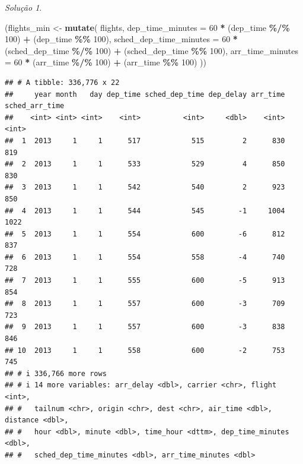 \documentclass[
]{latex/krantz}
\newenvironment{Shaded}{\begin{snugshade}}{\end{snugshade}}
\newcommand{\AttributeTok}[1]{\textcolor[rgb]{0.13,0.29,0.53}{#1}}
\newcommand{\DecValTok}[1]{\textcolor[rgb]{0.00,0.00,0.81}{#1}}
\newcommand{\FunctionTok}[1]{\textcolor[rgb]{0.13,0.29,0.53}{\textbf{#1}}}
\newcommand{\NormalTok}[1]{#1}
\newcommand{\OtherTok}[1]{\textcolor[rgb]{0.56,0.35,0.01}{#1}}
\newcommand{\SpecialCharTok}[1]{\textcolor[rgb]{0.81,0.36,0.00}{\textbf{#1}}}
\theoremstyle{definition}
\theoremstyle{definition}
\theoremstyle{definition}
\theoremstyle{definition}
\theoremstyle{remark}
\newtheorem*{solution}{Solução}
\begin{document}
\begin{solution}
\leavevmode

\begin{Shaded}
\begin{Highlighting}[]
\NormalTok{(flights\_min }\OtherTok{\textless{}{-}} \FunctionTok{mutate}\NormalTok{(}
\NormalTok{                    flights,}
                    \AttributeTok{dep\_time\_minutes =} \DecValTok{60} \SpecialCharTok{*}\NormalTok{ (dep\_time }\SpecialCharTok{\%/\%} \DecValTok{100}\NormalTok{) }\SpecialCharTok{+}\NormalTok{ (dep\_time }\SpecialCharTok{\%\%} \DecValTok{100}\NormalTok{),}
                    \AttributeTok{sched\_dep\_time\_minutes =} \DecValTok{60} \SpecialCharTok{*}\NormalTok{ (sched\_dep\_time }\SpecialCharTok{\%/\%} \DecValTok{100}\NormalTok{) }\SpecialCharTok{+}\NormalTok{ (sched\_dep\_time }\SpecialCharTok{\%\%} \DecValTok{100}\NormalTok{),}
                    \AttributeTok{arr\_time\_minutes =} \DecValTok{60} \SpecialCharTok{*}\NormalTok{ (arr\_time }\SpecialCharTok{\%/\%} \DecValTok{100}\NormalTok{) }\SpecialCharTok{+}\NormalTok{ (arr\_time }\SpecialCharTok{\%\%} \DecValTok{100}\NormalTok{)}
\NormalTok{                ))}
\end{Highlighting}
\end{Shaded}

\begin{verbatim}
## # A tibble: 336,776 x 22
##     year month   day dep_time sched_dep_time dep_delay arr_time sched_arr_time
##    <int> <int> <int>    <int>          <int>     <dbl>    <int>          <int>
##  1  2013     1     1      517            515         2      830            819
##  2  2013     1     1      533            529         4      850            830
##  3  2013     1     1      542            540         2      923            850
##  4  2013     1     1      544            545        -1     1004           1022
##  5  2013     1     1      554            600        -6      812            837
##  6  2013     1     1      554            558        -4      740            728
##  7  2013     1     1      555            600        -5      913            854
##  8  2013     1     1      557            600        -3      709            723
##  9  2013     1     1      557            600        -3      838            846
## 10  2013     1     1      558            600        -2      753            745
## # i 336,766 more rows
## # i 14 more variables: arr_delay <dbl>, carrier <chr>, flight <int>,
## #   tailnum <chr>, origin <chr>, dest <chr>, air_time <dbl>, distance <dbl>,
## #   hour <dbl>, minute <dbl>, time_hour <dttm>, dep_time_minutes <dbl>,
## #   sched_dep_time_minutes <dbl>, arr_time_minutes <dbl>
\end{verbatim}

\end{solution}
\end{document}
